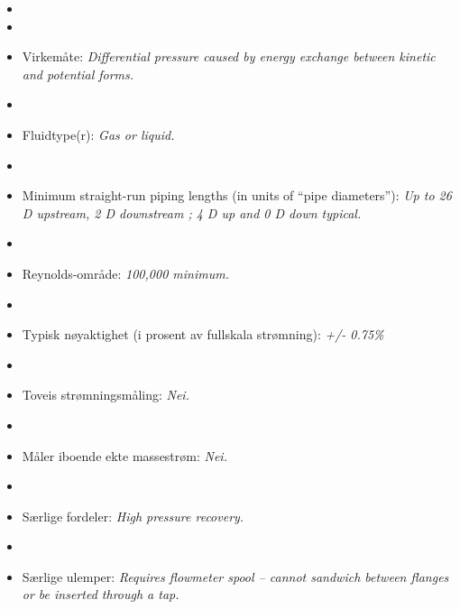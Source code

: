 \begin{itemize}
\goodbreak
\item{} 
\vskip 5pt
\item\item{} Virkemåte: {\it Differential pressure caused by energy exchange between kinetic and potential forms.}
\vskip 5pt
\item\item{} Fluidtype(r): {\it Gas or liquid.}
\vskip 5pt
\item\item{} Minimum straight-run piping lengths (in units of ``pipe diameters''): {\it Up to 26 D upstream, 2 D downstream ; 4 D up and 0 D down typical.}
\vskip 5pt
\item\item{} Reynolds-område: {\it 100,000 minimum.}
\vskip 5pt
\item\item{} Typisk nøyaktighet (i prosent av fullskala strømning): {\it +/- 0.75\%}
\vskip 5pt
\item\item{} Toveis strømningsmåling: {\it Nei.}
\vskip 5pt
\item\item{} Måler iboende ekte massestrøm: {\it Nei.}
\vskip 5pt
\item\item{} Særlige fordeler: {\it High pressure recovery.}
\vskip 5pt
\item\item{} Særlige ulemper: {\it Requires flowmeter spool -- cannot sandwich between flanges or be inserted through a tap.}
\end{itemize}

